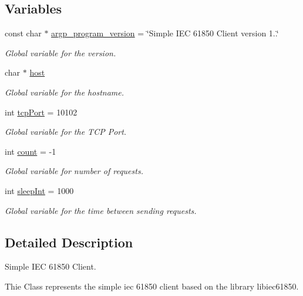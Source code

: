 \subsection*{Variables}
\begin{DoxyCompactItemize}
\item 
const char $\ast$ \hyperlink{simple-iec61850-client_8c_a62f73ea01c816f1996aed4c66f57c4fb}{argp\+\_\+program\+\_\+version} = \char`\"{}Simple I\+EC 61850 Client version 1..\char`\"{}
\begin{DoxyCompactList}\small\item\em Global variable for the version. \end{DoxyCompactList}\item 
char $\ast$ \hyperlink{simple-iec61850-client_8c_a1c2046dcb30a629d6d9f45ff8f403f12}{host}
\begin{DoxyCompactList}\small\item\em Global variable for the hostname. \end{DoxyCompactList}\item 
int \hyperlink{simple-iec61850-client_8c_ac31354d08316076b496efb2b3a2c69e6}{tcp\+Port} = 10102
\begin{DoxyCompactList}\small\item\em Global variable for the T\+CP Port. \end{DoxyCompactList}\item 
int \hyperlink{simple-iec61850-client_8c_ad43c3812e6d13e0518d9f8b8f463ffcf}{count} = -\/1
\begin{DoxyCompactList}\small\item\em Global variable for number of requests. \end{DoxyCompactList}\item 
int \hyperlink{simple-iec61850-client_8c_a7c0b25939579bd308b11966fb04288e0}{sleep\+Int} = 1000
\begin{DoxyCompactList}\small\item\em Global variable for the time between sending requests. \end{DoxyCompactList}\end{DoxyCompactItemize}


\subsection{Detailed Description}
Simple I\+EC 61850 Client. 

Thie Class represents the simple iec 61850 client based on the library libiec61850.

